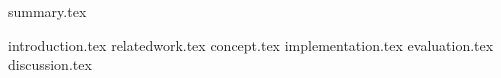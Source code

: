 \documentclass[ncs,12pt,oneside,german,listof=totoc]{YY_Styles/abschlussarbeit}
\begin{document}
%
%
\renewcommand{\baselinestretch}{1.08}

\thispagestyle{empty}
\newpage
\thispagestyle{empty}
\cleardoublepage
\thispagestyle{empty}

%
\renewcommand{\baselinestretch}{1.08}
%

%
{summary.tex}
%
\setcounter{secnumdepth}{3}
\setcounter{tocdepth}{2}
\tableofcontents
%
%
%
\cleardoublepage
{} \label{listoffigures}
\listoffigures
%
\cleardoublepage
{} \label{listoftables}
\listoftables
%
\cleardoublepage
%


\begin{mainmatter}

{introduction.tex}
{relatedwork.tex}
{concept.tex}
{implementation.tex}
{evaluation.tex}
{discussion.tex}

\cleardoublepage
{} \label{bibliography}



\end{mainmatter}

\end{document}
